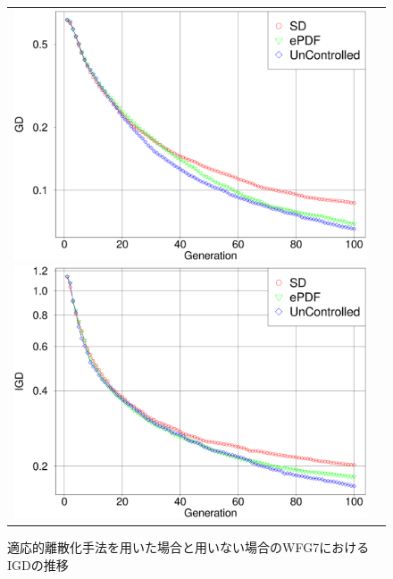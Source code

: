 \documentclass[../main/main]{subfiles}
\begin{document}
\begin{figure}[!ht]
\begin{tabular}{cc}
\begin{minipage}{0.49\hsize}
\includegraphics[width=1\linewidth]{../figures/WFG7_GD.eps}
\caption{適応的離散化手法を用いた場合と用いない場合のWFG7におけるGDの推移}
\label{wfg7_gd_transition}
\end{minipage}
\begin{minipage}{0.49\hsize}
\includegraphics[width=1\linewidth]{../figures/WFG7_IGD.eps}
\caption{適応的離散化手法を用いた場合と用いない場合のWFG7におけるIGDの推移}
\label{wfg7_igd_transition}
\end{minipage}
\end{tabular}
\end{figure}
\end{document}
